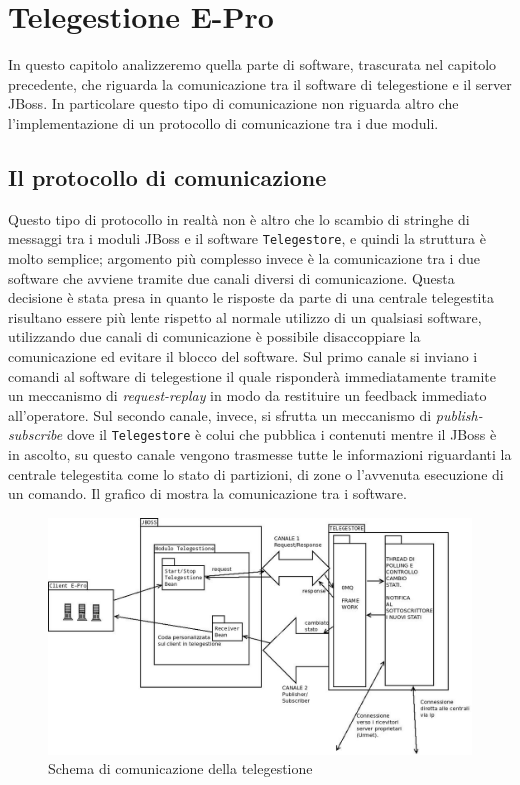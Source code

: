 \chapter{Telegestione E-Pro}
\label{capitolo6}
\thispagestyle{empty}
In questo capitolo analizzeremo quella parte di software, trascurata nel capitolo precedente, che riguarda la comunicazione tra il software di telegestione e il server JBoss. In particolare questo tipo di comunicazione non riguarda altro che l'implementazione di un protocollo di comunicazione tra i due moduli.
\section{Il protocollo di comunicazione}
Questo tipo di protocollo in realtà non è altro che lo scambio di stringhe di messaggi tra i moduli JBoss e il software \texttt{Telegestore}, e quindi la struttura è molto semplice; argomento più complesso invece è la comunicazione tra i due software che avviene tramite due canali diversi di comunicazione. Questa decisione è stata presa in quanto le  risposte da parte di una centrale telegestita risultano essere più lente rispetto al normale utilizzo di un qualsiasi software, utilizzando due canali di comunicazione è possibile disaccoppiare la comunicazione ed evitare il blocco del software. Sul primo canale si inviano i comandi al software di telegestione il quale risponderà immediatamente tramite un meccanismo di \emph{request-replay} in modo da restituire un feedback immediato all'operatore. Sul secondo canale, invece, si sfrutta un meccanismo di \emph{publish-subscribe} dove il \texttt{Telegestore} è colui che pubblica i contenuti mentre il JBoss è in ascolto, su questo canale vengono trasmesse tutte le informazioni riguardanti la centrale telegestita come lo stato di partizioni, di zone o l'avvenuta esecuzione di un comando. Il grafico di  mostra la comunicazione tra i software.
\begin{figure}
	\centering
	\includegraphics[width=\linewidth]{pictures/telejboss.jpeg}
	\caption{Schema di comunicazione della telegestione}\label{fig:teleJboss}
\end{figure}
